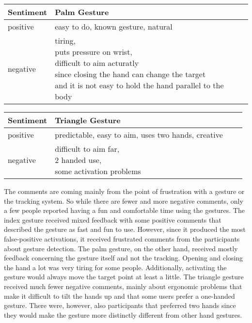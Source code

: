 \begin{table}[]
\centering
\begin{tabular}{llll}
\hline
Sentiment &
    Palm Gesture \\ \hline
positive &
    easy to do, known gesture, natural \\ \hline
negative &
    \makecell{tiring,\\ puts pressure on wrist,\\ difficult to aim acturatly \\ since closing the hand can change the target\\ and it is not easy to hold the hand parallel to the body} \\ \hline
\end{tabular}
\label{tbl:interview2}
\end{table}

\begin{table}[]
\centering
\begin{tabular}{llll}
\hline
Sentiment &
    Triangle Gesture \\ \hline
positive &
    predictable, easy to aim, uses two hands, creative \\ \hline
negative &
    \makecell{difficult to aim far,\\ 2 handed use,\\ some activation problems} \\ \hline
\end{tabular}
\label{tbl:interview3}
\end{table}

The comments are coming mainly from the point of frustration with a gesture or the tracking system. So while there are fewer and more negative comments, only a few people reported having a fun and comfortable time using the gestures. The index gesture received mixed feedback with some positive comments that described the gesture as fast and fun to use. However, since it produced the most false-positive activations, it received frustrated comments from the participants about gesture detection. The palm gesture, on the other hand, received mostly feedback concerning the gesture itself and not the tracking. Opening and closing the hand a lot was very tiring for some people. Additionally, activating the gesture would always move the target point at least a little. The triangle gesture received much fewer negative comments, mainly about ergonomic problems that make it difficult to tilt the hands up and that some users prefer a one-handed gesture. There were, however, also participants that preferred two hands since they would make the gesture more distinctly different from other hand gestures. 
